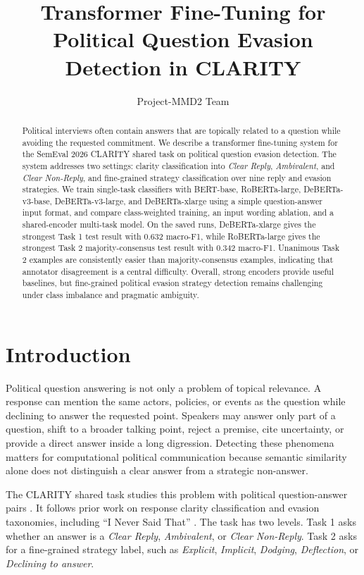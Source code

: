 \documentclass[11pt,twocolumn]{article}
\title{Transformer Fine-Tuning for Political Question Evasion Detection in CLARITY}
\author{Project-MMD2 Team}
\date{}
\newcommand{\taskone}{Task 1}
\newcommand{\tasktwo}{Task 2}
\newcommand{\macroF}{macro-F1}
\begin{document}
\maketitle

\begin{abstract}
Political interviews often contain answers that are topically related to a question while avoiding the requested commitment. We describe a transformer fine-tuning system for the SemEval 2026 CLARITY shared task on political question evasion detection. The system addresses two settings: clarity classification into \textit{Clear Reply}, \textit{Ambivalent}, and \textit{Clear Non-Reply}, and fine-grained strategy classification over nine reply and evasion strategies. We train single-task classifiers with BERT-base, RoBERTa-large, DeBERTa-v3-base, DeBERTa-v3-large, and DeBERTa-xlarge using a simple question-answer input format, and compare class-weighted training, an input wording ablation, and a shared-encoder multi-task model. On the saved runs, DeBERTa-xlarge gives the strongest \taskone{} test result with 0.632 \macroF{}, while RoBERTa-large gives the strongest \tasktwo{} majority-consensus test result with 0.342 \macroF{}. Unanimous \tasktwo{} examples are consistently easier than majority-consensus examples, indicating that annotator disagreement is a central difficulty. Overall, strong encoders provide useful baselines, but fine-grained political evasion strategy detection remains challenging under class imbalance and pragmatic ambiguity.
\end{abstract}

\section{Introduction}

Political question answering is not only a problem of topical relevance. A response can mention the same actors, policies, or events as the question while declining to answer the requested point. Speakers may answer only part of a question, shift to a broader talking point, reject a premise, cite uncertainty, or provide a direct answer inside a long digression. Detecting these phenomena matters for computational political communication because semantic similarity alone does not distinguish a clear answer from a strategic non-answer.

The CLARITY shared task studies this problem with political question-answer pairs \citep{clarity2026,qevasion_dataset}. It follows prior work on response clarity classification and evasion taxonomies, including ``I Never Said That'' \citep{ineversaidthat}. The task has two levels. \taskone{} asks whether an answer is a \textit{Clear Reply}, \textit{Ambivalent}, or \textit{Clear Non-Reply}. \tasktwo{} asks for a fine-grained strategy label, such as \textit{Explicit}, \textit{Implicit}, \textit{Dodging}, \textit{Deflection}, or \textit{Declining to answer}.
\end{document}
